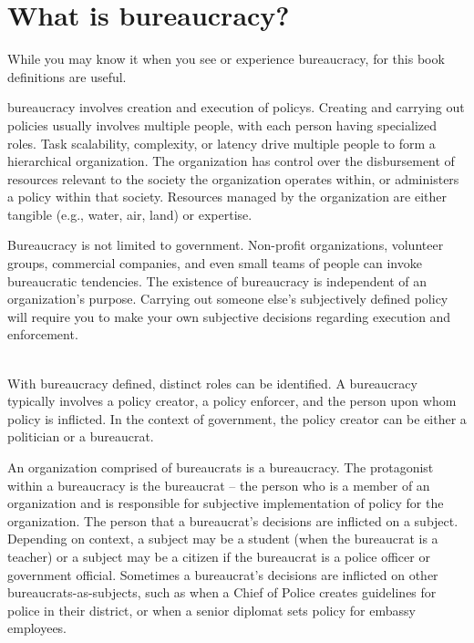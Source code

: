 \section{What is bureaucracy?\label{sec:define_bureaucracy}}

While you may know it when you see or experience bureaucracy, for this book definitions are useful. 

\Gls{bureaucracy} involves creation and execution of \glspl{policy}. Creating and carrying out policies usually involves multiple people, with each person having specialized roles. Task scalability, complexity, or latency drive multiple people to form a hierarchical organization. The organization has control over the disbursement of resources relevant to the society the organization operates within, or administers a policy within that society. Resources managed by the organization are either tangible (e.g., water, air, land) or expertise.  

Bureaucracy is not limited to government. Non-profit organizations, volunteer groups, commercial companies, and even small teams of people can invoke bureaucratic tendencies. The existence of bureaucracy is independent of an organization's purpose. Carrying out someone else's subjectively defined policy will require you to make your own subjective decisions regarding execution and enforcement. 

\ \\

With bureaucracy defined, distinct roles can be identified.
A bureaucracy typically involves a policy creator, a policy enforcer, and the person upon whom policy is inflicted. In the context of government, the policy creator can be either a politician or a bureaucrat. 

An organization comprised of bureaucrats is a \gls{bureaucracy}. The protagonist within a bureaucracy is the \gls{bureaucrat} -- the person who is a member of an organization and is responsible for subjective implementation of policy for the organization. The person that a bureaucrat's decisions are inflicted on a \gls{subject}.  Depending on context, a subject may be a student (when the bureaucrat is a teacher) or a subject may be a citizen if the bureaucrat is a police officer or government official. Sometimes a bureaucrat's decisions are inflicted on other bureaucrats-as-subjects, such as when a Chief of Police creates guidelines for police in their district, or when a senior diplomat sets policy for embassy employees. 



